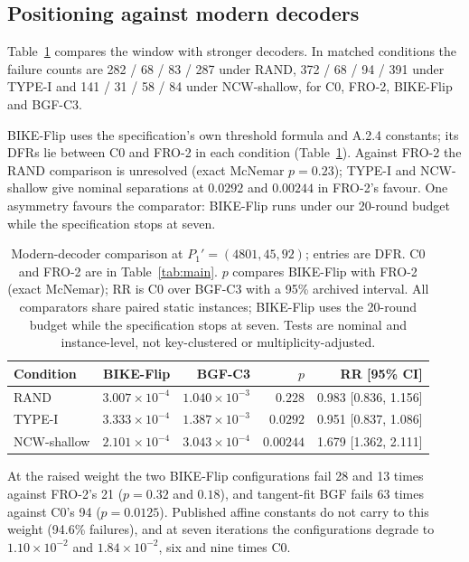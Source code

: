 \documentclass[runningheads,a4paper]{llncs}
\begin{document}
\subsection{Positioning against modern decoders}\label{sec:modern}

Table~\ref{tab:modern} compares the window with stronger decoders. In matched conditions the failure counts are 282 / 68 / 83 / 287 under RAND, 372 / 68 / 94 / 391 under TYPE-I and 141 / 31 / 58 / 84 under NCW-shallow, for C0, FRO-2, BIKE-Flip and BGF-C3.

BIKE-Flip uses the specification's own threshold formula and A.2.4 constants; its DFRs lie between C0 and FRO-2 in each condition (Table~\ref{tab:modern}). Against FRO-2 the RAND comparison is unresolved (exact McNemar $p=0.23$); TYPE-I and NCW-shallow give nominal separations at $0.0292$ and $0.00244$ in FRO-2's favour. One asymmetry favours the comparator: BIKE-Flip runs under our 20-round budget while the specification stops at seven.

\begin{table}[!tb]
\centering
\footnotesize
\setlength{\tabcolsep}{3pt}
\caption{Modern-decoder comparison at $P_1'=(4801,45,92)$; entries are DFR. C0 and FRO-2 are in Table~\ref{tab:main}. $p$ compares BIKE-Flip with FRO-2 (exact McNemar); RR is C0 over BGF-C3 with a 95\% archived interval. All comparators share paired static instances; BIKE-Flip uses the 20-round budget while the specification stops at seven. Tests are nominal and instance-level, not key-clustered or multiplicity-adjusted.}
\label{tab:modern}
\begin{tabular}{@{}lrrrr@{}}
\toprule
Condition & BIKE-Flip & BGF-C3 & $p$ & RR [95\% CI] \\
\midrule
RAND & $3.007\times10^{-4}$ & $1.040\times10^{-3}$ & $0.228$ & 0.983 [0.836, 1.156] \\
TYPE-I & $3.333\times10^{-4}$ & $1.387\times10^{-3}$ & $0.0292$ & 0.951 [0.837, 1.086] \\
NCW-shallow & $2.101\times10^{-4}$ & $3.043\times10^{-4}$ & $0.00244$ & 1.679 [1.362, 2.111] \\
\bottomrule
\end{tabular}
\end{table}

At the raised weight the two BIKE-Flip configurations fail 28 and 13 times against FRO-2's 21 ($p=0.32$ and $0.18$), and tangent-fit BGF fails 63 times against C0's 94 ($p=0.0125$). Published affine constants do not carry to this weight (94.6\% failures), and at seven iterations the configurations degrade to $1.10\times10^{-2}$ and $1.84\times10^{-2}$, six and nine times C0.
\end{document}
